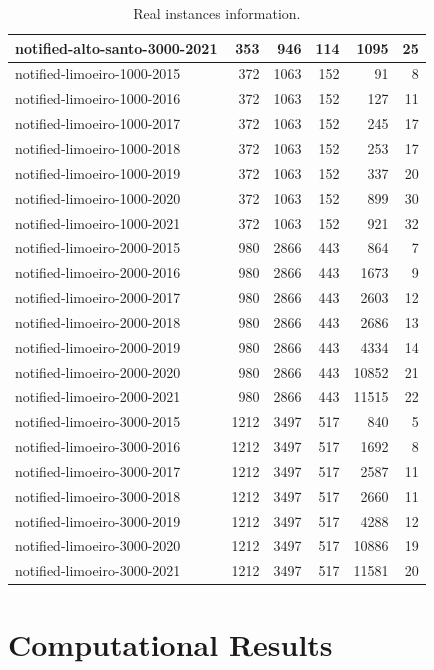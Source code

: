 \documentclass[a4paper,11pt]{article}
\begin{document}
\begin{table}[!ht]
{\begin{tabular}{lrrrrr}
notified-alto-santo-3000-2021 & 353  & 946  & 114 & 1095  & 25 \\ \hline
notified-limoeiro-1000-2015   & 372  & 1063 & 152 & 91    & 8  \\
notified-limoeiro-1000-2016   & 372  & 1063 & 152 & 127   & 11 \\
notified-limoeiro-1000-2017   & 372  & 1063 & 152 & 245   & 17 \\
notified-limoeiro-1000-2018   & 372  & 1063 & 152 & 253   & 17 \\
notified-limoeiro-1000-2019   & 372  & 1063 & 152 & 337   & 20 \\
notified-limoeiro-1000-2020   & 372  & 1063 & 152 & 899   & 30 \\
notified-limoeiro-1000-2021   & 372  & 1063 & 152 & 921   & 32 \\ \hline
notified-limoeiro-2000-2015   & 980  & 2866 & 443 & 864   & 7  \\
notified-limoeiro-2000-2016   & 980  & 2866 & 443 & 1673  & 9  \\
notified-limoeiro-2000-2017   & 980  & 2866 & 443 & 2603  & 12 \\
notified-limoeiro-2000-2018   & 980  & 2866 & 443 & 2686  & 13 \\
notified-limoeiro-2000-2019   & 980  & 2866 & 443 & 4334  & 14 \\
notified-limoeiro-2000-2020   & 980  & 2866 & 443 & 10852 & 21 \\
notified-limoeiro-2000-2021   & 980  & 2866 & 443 & 11515 & 22 \\ \hline
notified-limoeiro-3000-2015   & 1212 & 3497 & 517 & 840   & 5  \\
notified-limoeiro-3000-2016   & 1212 & 3497 & 517 & 1692  & 8  \\
notified-limoeiro-3000-2017   & 1212 & 3497 & 517 & 2587  & 11 \\
notified-limoeiro-3000-2018   & 1212 & 3497 & 517 & 2660  & 11 \\
notified-limoeiro-3000-2019   & 1212 & 3497 & 517 & 4288  & 12 \\
notified-limoeiro-3000-2020   & 1212 & 3497 & 517 & 10886 & 19 \\
notified-limoeiro-3000-2021   & 1212 & 3497 & 517 & 11581 & 20 \\ \hline
\end{tabular}%
}
\caption{Real instances information.}
\label{tab:real-instances}
\end{table}

\newpage
\section{Computational Results} \label{sec:computational-results}
\end{document}
